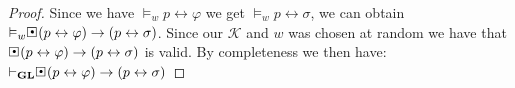 \documentclass[../main.tex]{subfiles}
\begin{document}
\begin{proof}
	Since we have $\vDash_w p\leftrightarrow\varphi$ we get $\vDash_w
	p\leftrightarrow\sigma$, we can obtain
	$\vDash_w\sBox(p\leftrightarrow\varphi)\rightarrow(p\leftrightarrow\sigma)$.
	Since our $\mathcal{K}$ and $w$ was chosen at random we have that
	$\sBox(p\leftrightarrow\varphi)\rightarrow(p\leftrightarrow\sigma)$ is
	valid. By completeness we then have:
	$\vdash_\GL\sBox(p\leftrightarrow\varphi)\rightarrow(p\leftrightarrow
	\sigma)$
\end{proof}
\end{document}
